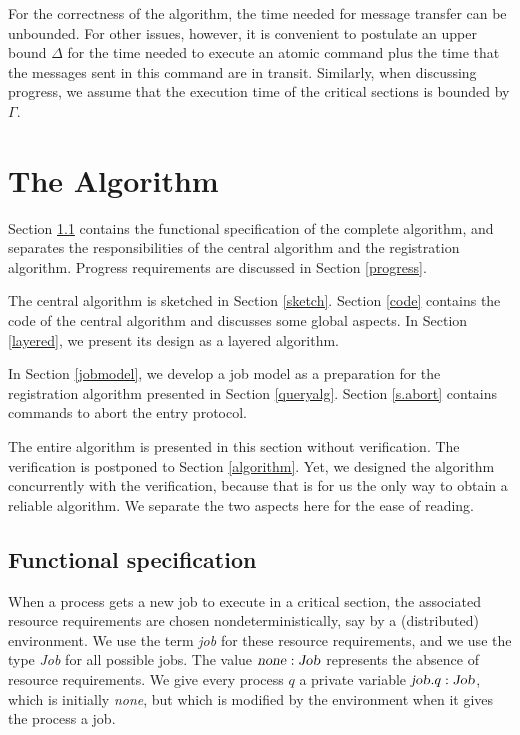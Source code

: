 \documentclass[10pt]{article} \usepackage[english]{babel}
\def\S #1/{\mbox {\textsl{#1}}}
\begin{document}
For the correctness of the algorithm, the time needed for message
transfer can be unbounded. For other issues, however, it is convenient
to postulate an upper bound $\Delta$ for the time needed to execute an
atomic command plus the time that the messages sent in this command
are in transit.  Similarly, when discussing progress, we assume that
the execution time of the critical sections is bounded by $\Gamma$.

\section {The  Algorithm} \label{intromain}
\label{fifoalg}

Section \ref{funcspec} contains the functional specification of the
complete algorithm, and separates the responsibilities of the central
algorithm and the registration algorithm.   Progress requirements are
discussed in Section \ref {progress}.  

The central algorithm is sketched in Section \ref{sketch}. Section
\ref{code} contains the code of the central algorithm and discusses
some global aspects.  In Section \ref{layered}, we present its design
as a layered algorithm. 

In Section \ref{jobmodel}, we develop a job model as a preparation for
the registration algorithm presented in Section \ref{queryalg}.
Section \ref{s.abort} contains commands to abort the entry protocol.

The entire algorithm is presented in this section without
verification.  The verification is postponed to Section
\ref{algorithm}.  Yet, we designed the algorithm concurrently with the
verification, because that is for us the only way to obtain a reliable
algorithm.  We separate the two aspects here for the ease of reading.

\subsection{Functional specification} \label{funcspec}\label{safetyreq}

When a process gets a new job to execute in a critical section, the
associated resource requirements are chosen nondeterministically, say
by a (distributed) environment.  We use the term \emph{job} for these
resource requirements, and we use the type \S Job/ for all possible
jobs.  The value $\S none/:\S Job/$ represents the absence of resource
requirements.  We give every process $q$ a private variable $\S job/.q
:\S Job/$, which is initially \S none/, but which is modified by the
environment when it gives the process a job.
\end{document}
